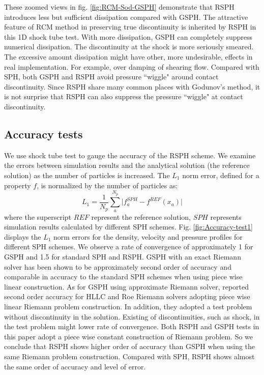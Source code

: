 These zoomed views in fig. \ref{fig:RCM-Sod-GSPH} demonstrate that RSPH introduces less but sufficient dissipation compared with GSPH. The attractive feature of RCM method in preserving true discontinuity is inherited by RSPH in this 1D shock tube test. With more dissipation, GSPH can completely suppress numerical dissipation. The discontinuity at the shock is more seriously smeared. The excessive amount dissipation might have other, more undesirable, effects in real implementation. For example, over damping of shearing flow. Compared with SPH, both GSPH and RSPH avoid pressure ``wiggle" around contact discontinuity. Since RSPH share many common places with Godunov's method, it is not surprise that RSPH can also suppress the pressure ``wiggle" at contact discontinuity.

\subsection{Accuracy tests}
We use shock tube test to gauge the accuracy of the RSPH scheme.
We examine the errors between simulation results and the analytical solution (the reference solution) as the number of particles is increased. The $L_1$ norm error, defined for a property $f$, is normalized by the number of particles as:
\begin{equation}
L_1= \frac{1}{N_p} \sum_a^{N_p} \vert f_a^{SPH} - f^{REF} (x_a) \vert 
\end{equation}
where the superscript $REF$ represent the reference solution, $SPH$ represents simulation results calculated by different SPH schemes. Fig. \ref{fig:Accuracy-test1} displays the $L_1$ norm errors for the density, velocity and pressure profiles for different SPH schemes.
We observe a rate of convergence of approximately 1 for GSPH and 1.5 for standard SPH and RSPH.
GSPH with an exact Riemann solver has been shown to be approximately second order of accuracy \citep{puri2014comparison} and comparable in accuracy to the standard SPH schemes when using piece wise linear construction. As for GSPH using approximate Riemann solver, \citet{puri2014approximate} reported second order accuracy for HLLC and Roe Riemann solvers adopting piece wise linear Riemann problem construction. In addition, they adopted a test problem without discontinuity in the solution. Existing of discontinuities, such as shock, in the test problem might lower rate of convergence. Both RSPH and GSPH tests in this paper adopt a piece wise constant construction of Riemann problem. So we conclude that RSPH shows higher order of accuracy than GSPH when using the same Riemann problem construction. Compared with SPH, RSPH shows almost the same order of accuracy and level of error.
